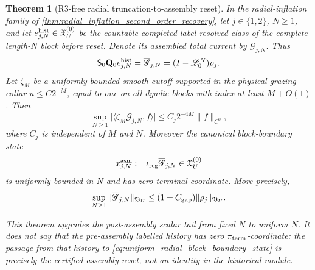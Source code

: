 \documentclass[11pt]{amsart}
\theoremstyle{compactplain}
\newtheorem{theorem}{Theorem}[section]
\theoremstyle{compactdefinition}
\theoremstyle{compactremark}
\newcommand{\Ltransfer}{\mathscr L}
\begin{document}
\begin{theorem}[R3-free radial truncation-to-assembly reset]
\label{thm:uniform_postassembly_radial_tail}
In the radial-inflation family of
\cref{thm:radial_inflation_second_order_recovery}, let
\(j\in\{1,2\}\), \(N\ge1\), and let
\(e_{j,N}^{\rm hist}\in\mathfrak X_U^{(0)}\) be the countable completed
label-resolved class of the complete length-\(N\) block before reset.  Denote
its assembled total
current by \(\overline{\mathscr G}_{j,N}\).  Thus
\begin{equation}
\label{eq:radial_postassembly_current}
 \mathsf S_0\mathbf Q_0e_{j,N}^{\rm hist}
 =\overline{\mathscr G}_{j,N}
 =(I-\Ltransfer_0^N)\rho_j .
\end{equation}
Let \(\zeta_M\) be a uniformly bounded smooth cutoff supported in the physical
grazing collar \(u\le C2^{-M}\), equal to one on all dyadic blocks with index
at least \(M+O(1)\).  Then
\begin{equation}
\label{eq:uniform_postassembly_radial_tail}
 \sup_{N\ge1}
 \bigl|\langle\zeta_M\overline{\mathscr G}_{j,N},f\rangle\bigr|
 \le C_j2^{-4M}\|f\|_{C^0},
\end{equation}
where \(C_j\) is independent of \(M\) and \(N\).  Moreover the canonical
block-boundary state
\begin{equation}
\label{eq:uniform_radial_block_boundary_state}
 x_{j,N}^{\rm asm}
 :=\iota_{\rm reg}\overline{\mathscr G}_{j,N}
 \in\mathfrak X_U^{(0)}
\end{equation}
is uniformly bounded in \(N\) and has zero terminal coordinate.
More precisely,
\begin{equation}
\label{eq:uniform_radial_postassembly_B_bound}
 \sup_{N\ge1}\|\overline{\mathscr G}_{j,N}\|_{\mathfrak B_U}
 \le (1+C_{\rm gap})\|\rho_j\|_{\mathfrak B_U}.
\end{equation}

This theorem upgrades the \emph{post-assembly scalar} tail from fixed \(N\)
to uniform \(N\).  It does not say that the pre-assembly labelled history has
zero \(\pi_{\rm term}\)-coordinate: the passage from that history to
\eqref{eq:uniform_radial_block_boundary_state} is precisely the certified
assembly reset, not an identity in the historical module.


\end{theorem}
\end{document}
